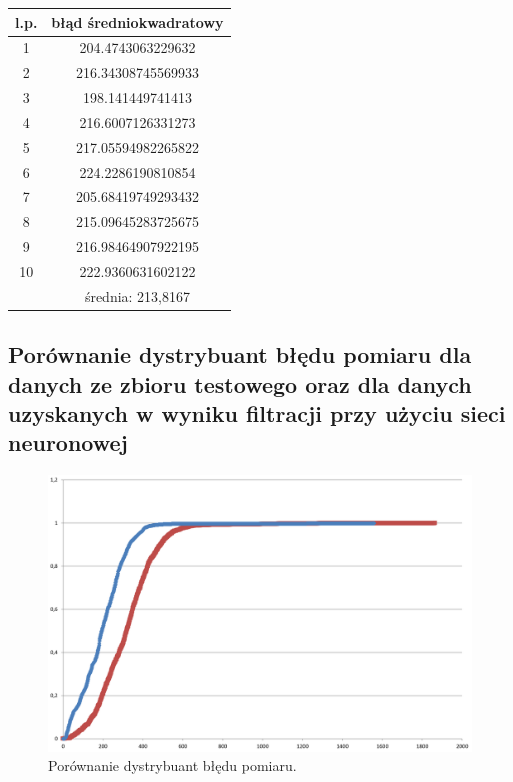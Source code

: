 \documentclass{classrep}
\begin{document}
\begin{center}
	\begin{tabular}{c c} 
		\hline
		l.p. & błąd średniokwadratowy \\ [0.5ex] 
		\hline\hline
		
		1 & 204.4743063229632 \\
		2 & 216.34308745569933 \\
		3 & 198.141449741413 \\
		4 & 216.6007126331273 \\
		5 & 217.05594982265822 \\
		6 & 224.2286190810854 \\
		7 & 205.68419749293432 \\
		8 & 215.09645283725675 \\
		9 & 216.98464907922195 \\
		10& 222.9360631602122 \\ 
		\hline
		\hline
		 &średnia: 213,8167 \\		
		\hline
	\end{tabular}
\end{center}

\newpage
\subsection{Porównanie dystrybuant błędu pomiaru dla danych ze zbioru testowego oraz dla danych uzyskanych w wyniku filtracji przy użyciu sieci neuronowej}

\begin{figure}[h!]
	\centering
	\includegraphics[width=1\textwidth]{dystrybuanta.png}
	\caption{Porównanie dystrybuant błędu pomiaru.}
	\label{dystrybuanta}
\end{figure}
\end{document}
